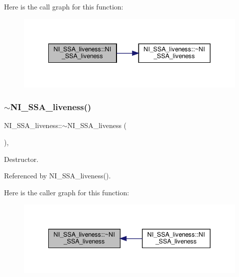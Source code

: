 Here is the call graph for this function\+:
\nopagebreak
\begin{figure}[H]
\begin{center}
\leavevmode
\includegraphics[width=342pt]{d6/db7/classNI__SSA__liveness_a96f6cf0c29fc5f8b666e715ab1a223b5_cgraph}
\end{center}
\end{figure}
\mbox{\label{classNI__SSA__liveness_acdaef526d16562e5df43797aad7aded0}} 
\subsubsection{\texorpdfstring{$\sim$\+N\+I\+\_\+\+S\+S\+A\+\_\+liveness()}{~NI\_SSA\_liveness()}}
{\footnotesize\ttfamily N\+I\+\_\+\+S\+S\+A\+\_\+liveness\+::$\sim$\+N\+I\+\_\+\+S\+S\+A\+\_\+liveness (\begin{DoxyParamCaption}{ }\end{DoxyParamCaption})\hspace{0.3cm}{\ttfamily [override]}, {\ttfamily [default]}}



Destructor. 



Referenced by N\+I\+\_\+\+S\+S\+A\+\_\+liveness().

Here is the caller graph for this function\+:
\nopagebreak
\begin{figure}[H]
\begin{center}
\leavevmode
\includegraphics[width=342pt]{d6/db7/classNI__SSA__liveness_acdaef526d16562e5df43797aad7aded0_icgraph}
\end{center}
\end{figure}


